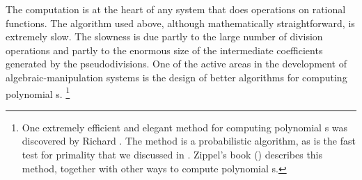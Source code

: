 The  computation is at the heart of any system that does operations on rational functions.
The algorithm used above, although mathematically straightforward, is extremely slow.
The slowness is due partly to the large number of division operations and partly to the enormous size of the intermediate coefficients generated by the pseudodivisions.
One of the active areas in the development of algebraic-manipulation systems is the design of better algorithms for computing polynomial s.%
\footnote{
	One extremely efficient and elegant method for computing polynomial s was discovered by Richard .
	The method is a probabilistic algorithm, as is the fast test for primality that we discussed in .
	Zippel’s book () describes this method, together with other ways to compute polynomial s.
}
